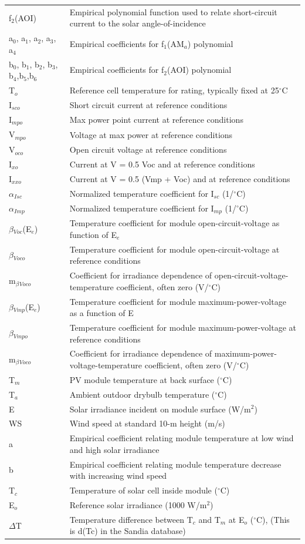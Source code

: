 \begin{longtable}[c]{p{1.2in}p{4.8in}}
f\(_{2}\)(AOI) & Empirical polynomial function used to relate short-circuit current to the solar angle-of-incidence \tabularnewline
a\(_{0}\), a\(_{1}\), a\(_{2}\), a\(_{3}\), a\(_{4}\) & Empirical coefficients for f\(_{1}\)(AM\(_{a}\)) polynomial \tabularnewline
b\(_{0}\), b\(_{1}\), b\(_{2}\), b\(_{3}\), b\(_{4}\),b\(_{5}\),b\(_{6}\) & Empirical coefficients for f\(_{2}\)(AOI) polynomial \tabularnewline
T\(_{o}\) & Reference cell temperature for rating, typically fixed at 25\(^{\circ}\)C \tabularnewline
I\(_{sco}\) & Short circuit current at reference conditions \tabularnewline
I\(_{mpo}\) & Max power point current at reference conditions \tabularnewline
V\(_{mpo}\) & Voltage at max power at reference conditions \tabularnewline
V\(_{oco}\) & Open circuit voltage at reference conditions \tabularnewline
I\(_{xo}\) & Current at V = 0.5 Voc and at reference conditions \tabularnewline
I\(_{xxo}\) & Current at V = 0.5 (Vmp + Voc) and at reference conditions \tabularnewline
$\alpha$\(_{Isc}\) & Normalized temperature coefficient for I\(_{sc}\) (1/\(^{\circ}\)C) \tabularnewline
$\alpha$\(_{Imp}\) & Normalized temperature coefficient for I\(_{mp}\) (1/\(^{\circ}\)C) \tabularnewline
$\beta$\(_{Voc}\)(E\(_{e}\)) & Temperature coefficient for module open-circuit-voltage as function of E\(_{e}\) \tabularnewline
$\beta$\(_{Voco}\) & Temperature coefficient for module open-circuit-voltage at reference conditions \tabularnewline
m\(_{\beta}\)\(_{Voco}\) & Coefficient for irradiance dependence of open-circuit-voltage-temperature coefficient, often zero (V/\(^{\circ}\)C) \tabularnewline
$\beta$\(_{Vmp}\)(E\(_{e}\)) & Temperature coefficient for module maximum-power-voltage as a function of E \tabularnewline
$\beta$\(_{Vmpo}\) & Temperature coefficient for module maximum-power-voltage at reference conditions \tabularnewline
m\(_{\beta}\)\(_{Voco}\) & Coefficient for irradiance dependence of maximum-power-voltage-temperature coefficient, often zero (V/\(^{\circ}\)C) \tabularnewline
T\(_{m}\) & PV module temperature at back surface (\(^{\circ}\)C) \tabularnewline
T\(_{a}\) & Ambient outdoor drybulb temperature (\(^{\circ}\)C) \tabularnewline
E & Solar irradiance incident on module surface (W/m\(^{2}\)) \tabularnewline
WS & Wind speed at standard 10-m height (m/s) \tabularnewline
a & Empirical coefficient relating module temperature at low wind and high solar irradiance \tabularnewline
b & Empirical coefficient relating module temperature decrease with increasing wind speed \tabularnewline
T\(_{c}\) & Temperature of solar cell inside module (\(^{\circ}\)C) \tabularnewline
E\(_{o}\) & Reference solar irradiance (1000 W/m\(^{2}\)) \tabularnewline
$\Delta$T & Temperature difference between T\(_{c}\) and T\(_{m}\) at E\(_{o}\) (\(^{\circ}\)C), (This is d(Tc) in the Sandia database) \tabularnewline
\bottomrule
\end{longtable}

